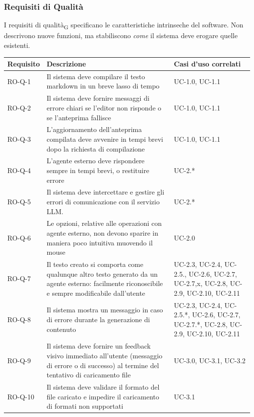\documentclass[11pt,a4paper]{article}
\begin{document}
\subsubsection{Requisiti di Qualità}
I requisiti di qualità\textsubscript{G} specificano le caratteristiche intrinseche del software. Non descrivono nuove funzioni, ma stabiliscono \textit{come} il sistema deve erogare quelle esistenti. 
\begin{longtable}{|p{}|>{\raggedright\arraybackslash}p{}|p{}|}
\hline
\textbf{Requisito} & \textbf{Descrizione} & \textbf{Casi d'uso correlati}\\
\hline

RO-Q-1 & Il sistema deve compilare il testo markdown in un breve lasso di tempo & UC-1.0, UC-1.1 \\
\hline
RO-Q-2 & Il sistema deve fornire messaggi di errore chiari se l'editor non risponde o se l'anteprima fallisce & UC-1.0, UC-1.1 \\
\hline
RO-Q-3 & L'aggiornamento dell'anteprima compilata deve avvenire in tempi brevi dopo la richiesta di compilazione & UC-1.0, UC-1.1 \\
\hline
RO-Q-4 & L'agente esterno deve rispondere sempre in tempi brevi, o restituire errore & UC-2.* \\
\hline
RO-Q-5 & Il sistema deve intercettare e gestire gli errori di comunicazione con il servizio LLM. & UC-2.* \\
\hline
RO-Q-6 & Le opzioni, relative alle operazioni con agente esterno, non devono sparire in maniera poco intuitiva muovendo il mouse & UC-2.0 \\
\hline
RO-Q-7 & Il testo creato si comporta come qualunque altro testo generato da un agente esterno: facilmente riconoscibile e sempre modificabile dall'utente & UC-2.3, UC-2.4, UC-2.5., UC-2.6, UC-2.7, UC-2.7,x, UC-2.8, UC-2.9, UC-2.10, UC-2.11 \\
\hline
RO-Q-8 & Il sistema mostra un messaggio in caso di errore durante la generazione di contenuto & UC-2.3, UC-2.4, UC-2.5.*, UC-2.6, UC-2.7, UC-2.7.*, UC-2.8, UC-2.9, UC-2.10, UC-2.11 \\
\hline
RO-Q-9 & Il sistema deve fornire un feedback visivo immediato all'utente (messaggio di errore o di successo) al termine del tentativo di caricamento file & UC-3.0, UC-3.1, UC-3.2 \\
\hline
RO-Q-10 & Il sistema deve validare il formato del file caricato e impedire il caricamento di formati non supportati & UC-3.1 \\

\end{longtable}
\end{document}
